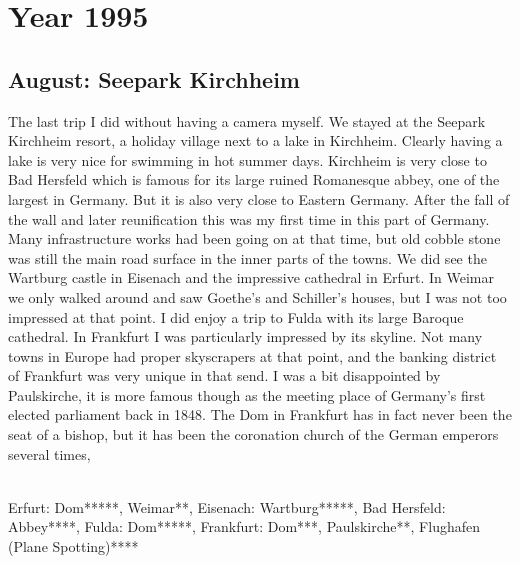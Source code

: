 \chapter{Year 1995}
\label{1995}

\section{August: Seepark Kirchheim}
\label{1995:Kirchheim}


The last trip I did without having a camera myself. We stayed at the Seepark Kirchheim resort, a holiday village next to a lake in Kirchheim. Clearly having a lake is very nice for swimming in hot summer days. Kirchheim is very close to Bad Hersfeld which is famous for its large ruined Romanesque abbey, one of the largest in Germany. But it is also very close to Eastern Germany. After the fall of the wall and later reunification this was my first time in this part of Germany. Many infrastructure works had been going on at that time, but old cobble stone was still the main road surface in the inner parts of the towns. We did see the Wartburg castle in Eisenach and the impressive cathedral in Erfurt. In Weimar we only walked around and saw Goethe's and Schiller's houses, but I was not too impressed at that point. I did enjoy a trip to Fulda with its large Baroque cathedral. In Frankfurt I was particularly impressed by its skyline. Not many towns in Europe had proper skyscrapers at that point, and the banking district of Frankfurt was very unique in that send. I was a bit disappointed by Paulskirche, it is more famous though as the meeting place of Germany's first elected parliament back in 1848. The Dom in Frankfurt has in fact never been the seat of a bishop, but it has been the coronation church of the German emperors several times,\\\

Erfurt: Dom*****, Weimar**, Eisenach: Wartburg*****, Bad Hersfeld: Abbey****, Fulda: Dom*****,
Frankfurt: Dom***, Paulskirche**, Flughafen (Plane Spotting)****